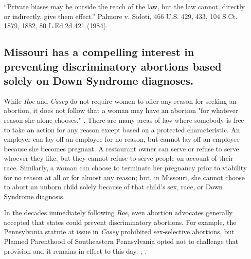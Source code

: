 \documentclass[12pt,\documentclassflag]{SCOTUS_Brief}
\begin{document}
“Private biases may be outside the reach of the law, but the law cannot, directly or indirectly, give them effect.” Palmore v. Sidoti, 466 U.S. 429, 433, 104 S.Ct. 1879, 1882, 80 L.Ed.2d 421 (1984).

\subsection{Missouri has a compelling interest in preventing discriminatory abortions based solely on Down Syndrome diagnoses.}

While \textit{Roe} \cite[!]{Roe} and \textit{Casey} \cite[!]{Casey} do not require women to offer any reason for seeking an abortion, it does not follow that a woman may have an abortion "for whatever reason she alone chooses." . There are many areas of law where somebody is free to take an action for any reason except based on a protected characteristic. An employer can lay off an employee for no reason, but cannot lay off an employee because she becomes pregnant. A restaurant owner can serve or refuse to serve whoever they like, but they cannot refuse to serve people on account of their race. Similarly, a woman can choose to terminate her pregnancy prior to viability for no reason at all or for almost any reason; but, in Missouri, she cannot choose to abort an unborn child solely because of that child’s sex, race, or Down Syndrome diagnosis.

In the decades immediately following \textit{Roe}, even abortion advocates generally accepted that states could prevent discriminatory abortions. For example, the Pennsylvania statute at issue in \textit{Casey} prohibited sex-selective abortions, but Planned Parenthood of Southeastern Pennsylvania opted not to challenge that provision and it remains in effect to this day. \See {}; \seealso {}.
\end{document}
